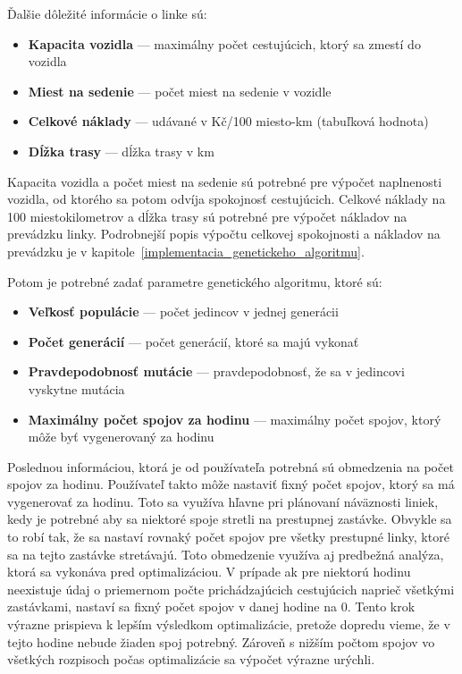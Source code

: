 Ďalšie dôležité informácie o linke sú:
\begin{itemize}
  \item \textbf{Kapacita vozidla} --- maximálny počet cestujúcich, ktorý sa zmestí do vozidla
  \item \textbf{Miest na sedenie} --- počet miest na sedenie v vozidle
  \item \textbf{Celkové náklady} --- udávané v Kč/100 miesto-km (tabuľková hodnota) 
  \item \textbf{Dĺžka trasy} --- dĺžka trasy v km
\end{itemize}
Kapacita vozidla a počet miest na sedenie sú potrebné pre výpočet naplnenosti vozidla, od ktorého sa potom odvíja spokojnosť cestujúcich.
Celkové náklady na 100 miestokilometrov a dĺžka trasy sú potrebné pre výpočet nákladov na prevádzku linky.
Podrobnejší popis výpočtu celkovej spokojnosti a nákladov na prevádzku je v kapitole~\ref{implementacia_genetickeho_algoritmu}.

Potom je potrebné zadať parametre genetického algoritmu, ktoré sú:
\begin{itemize}
  \item \textbf{Veľkosť populácie} --- počet jedincov v jednej generácii
  \item \textbf{Počet generácií} --- počet generácií, ktoré sa majú vykonať
  \item \textbf{Pravdepodobnosť mutácie} --- pravdepodobnosť, že sa v jedincovi vyskytne mutácia
  \item \textbf{Maximálny počet spojov za hodinu} --- maximálny počet spojov, ktorý môže byť vygenerovaný za hodinu
\end{itemize}
Poslednou informáciou, ktorá je od používateľa potrebná sú obmedzenia na počet spojov za hodinu.
Používateľ takto môže nastaviť fixný počet spojov, ktorý sa má vygenerovať za hodinu.
Toto sa využíva hľavne pri plánovaní náväznosti liniek, kedy je potrebné aby sa niektoré spoje stretli na prestupnej zastávke.
Obvykle sa to robí tak, že sa nastaví rovnaký počet spojov pre všetky prestupné linky, ktoré sa na tejto zastávke stretávajú.
Toto obmedzenie využíva aj predbežná analýza, ktorá sa vykonáva pred optimalizáciou.
V prípade ak pre niektorú hodinu neexistuje údaj o priemernom počte prichádzajúcich cestujúcich naprieč všetkými zastávkami, nastaví sa fixný počet spojov v danej hodine na 0.
Tento krok výrazne prispieva k lepším výsledkom optimalizácie, pretože dopredu vieme, že v tejto hodine nebude žiaden spoj potrebný.
Zároveň s nižším počtom spojov vo všetkých rozpisoch počas optimalizácie sa výpočet výrazne urýchli.

